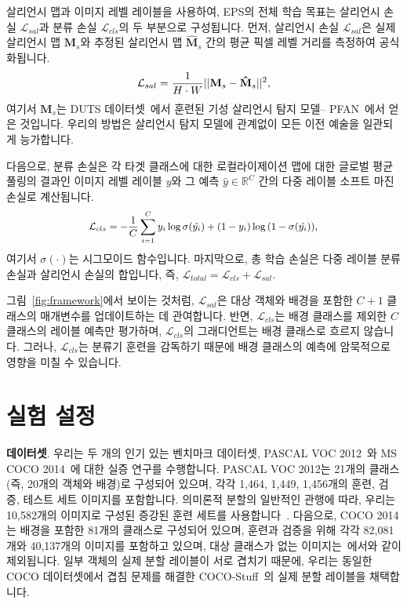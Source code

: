 \documentclass[final]{cvpr}
\begin{document}
살리언시 맵과 이미지 레벨 레이블을 사용하여, EPS의 전체 학습 목표는 살리언시 손실 $\mathcal{L}_{sal}$과 분류 손실 $\mathcal{L}_{cls}$의 두 부분으로 구성됩니다. 먼저, 살리언시 손실 $\mathcal{L}_{sal}$은 실제 살리언시 맵 $\mathbf{M}_{s}$와 추정된 살리언시 맵 $\mathbf{\hat{M}}_{s}$ 간의 평균 픽셀 레벨 거리를 측정하여 공식화됩니다.\vspace{-1mm}
\begin{equation}
{\small
\label{loss_sal}
\mathcal{L}_{sal} = \frac{1}{H\cdot W}||\mathbf{M}_{s}-\mathbf{\hat{M}}_{s}||^{2},
}\vspace{-1mm}
\end{equation}
\noindent 여기서 $\mathbf{M}_{s}$는 DUTS 데이터셋~\cite{wang2017learning}에서 훈련된 기성 살리언시 탐지 모델-- PFAN~\cite{zhao2019pyramid}에서 얻은 것입니다. 우리의 방법은 살리언시 탐지 모델에 관계없이 모든 이전 예술을 일관되게 능가합니다.

다음으로, 분류 손실은 각 타겟 클래스에 대한 로컬라이제이션 맵에 대한 글로벌 평균 풀링의 결과인 이미지 레벨 레이블 $y$와 그 예측 $\hat{y} \in \mathbb{R}^C$ 간의 다중 레이블 소프트 마진 손실로 계산됩니다.\vspace{-1mm}
\begin{equation}
{\small
\begin{split}
\label{loss_cls}
\mathcal{L}_{cls}= - \frac{1}{C} \sum_{i=1}^{C} y_i \log{\sigma(\hat{y_i})} + (1-y_i) \log{(1 - \sigma(\hat{y_i}))},
\end{split}}\vspace{-1mm}
\end{equation}
\noindent 여기서 $\sigma(\cdot)$는 시그모이드 함수입니다. 마지막으로, 총 학습 손실은 다중 레이블 분류 손실과 살리언시 손실의 합입니다, 즉, $\mathcal{L}_{total} = \mathcal{L}_{cls} + \mathcal{L}_{sal}$. 

그림~\ref{fig:framework}에서 보이는 것처럼, $\mathcal{L}_{sal}$은 대상 객체와 배경을 포함한 $C+1$ 클래스의 매개변수를 업데이트하는 데 관여합니다. 반면, $\mathcal{L}_{cls}$는 배경 클래스를 제외한 $C$ 클래스의 레이블 예측만 평가하며, $\mathcal{L}_{cls}$의 그래디언트는 배경 클래스로 흐르지 않습니다. 그러나, $\mathcal{L}_{cls}$는 분류기 훈련을 감독하기 때문에 배경 클래스의 예측에 암묵적으로 영향을 미칠 수 있습니다.

\section{실험 설정}
\noindent
\textbf{데이터셋}. 우리는 두 개의 인기 있는 벤치마크 데이터셋, PASCAL VOC 2012~\cite{everingham2015pascal}와 MS COCO 2014~\cite{lin2014microsoft}에 대한 실증 연구를 수행합니다. PASCAL VOC 2012는 21개의 클래스(즉, 20개의 객체와 배경)로 구성되어 있으며, 각각 1,464, 1,449, 1,456개의 훈련, 검증, 테스트 세트 이미지를 포함합니다. 의미론적 분할의 일반적인 관행에 따라, 우리는 10,582개의 이미지로 구성된 증강된 훈련 세트를 사용합니다~\cite{hariharan2011semantic}. 다음으로, COCO 2014는 배경을 포함한 81개의 클래스로 구성되어 있으며, 훈련과 검증을 위해 각각 82,081개와 40,137개의 이미지를 포함하고 있으며, 대상 클래스가 없는 이미지는~\cite{choe2020attention}에서와 같이 제외됩니다. 일부 객체의 실제 분할 레이블이 서로 겹치기 때문에, 우리는 동일한 COCO 데이터셋에서 겹침 문제를 해결한 COCO-Stuff~\cite{caesar2018coco}의 실제 분할 레이블을 채택합니다.
\end{document}
